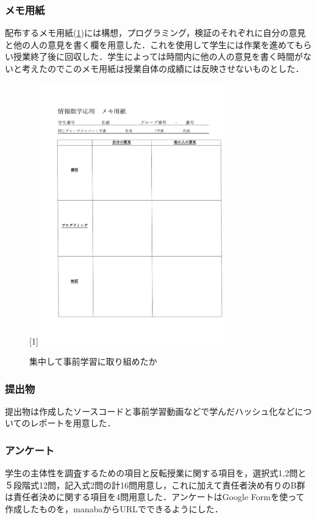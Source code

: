\documentclass[a4j,11pt]{jsarticle}
\begin{document}
\subsubsection{メモ用紙}
配布するメモ用紙(\ref{memo1})には構想，プログラミング，検証のそれぞれに自分の意見と他の人の意見を書く欄を用意した．これを使用して学生には作業を進めてもらい授業終了後に回収した．学生によっては時間内に他の人の意見を書く時間がないと考えたのでこのメモ用紙は授業自体の成績には反映させないものとした．

\begin{figure}[h]
\begin{center}
\scalebox{1}[1]{
 \includegraphics[clip,width=80mm]{memo1.pdf}
 }
\end{center}
 \caption{集中して事前学習に取り組めたか}
 \label{memo1}
\end{figure}
\newpage

\subsubsection{提出物}
提出物は作成したソースコードと事前学習動画などで学んだハッシュ化などについてのレポートを用意した．

\subsubsection{アンケート}
学生の主体性を調査するための項目と反転授業に関する項目を，選択式1,2問と５段階式12問，記入式2問の計16問用意し，これに加えて責任者決め有りのB群は責任者決めに関する項目を4問用意した．アンケートはGoogle Formを使って作成したものを，manabaからURLでできるようにした．
\end{document}
